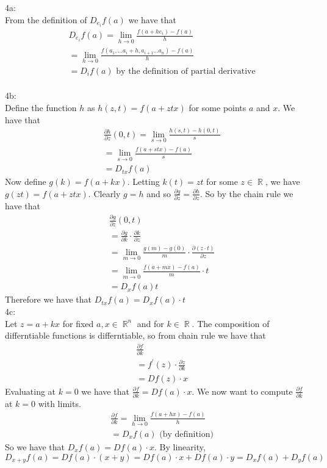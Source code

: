 \documentclass[letterpaper]{article}
\DeclareMathOperator{\R}{\mathbb{R}}
\begin{document}
 
4a:\\ From the definition of $D_{e_i}f(a)$ we have that 
\begin{align*}
   & D_{e_{i}}f(a) = \lim_{h \rightarrow 0 } \frac{f(a+he_i)-f(a)}{h}
   \\ & = \lim_{h \rightarrow 0} \frac{f(a_1, \dots a_i + h , a_{i+1} \dots a_n ) - f(a)}{h}
   \\ & = D_i f(a) \text{ by the definition of partial derivative}
\end{align*}
\\ 4b: \\ Define the function $h$  as $h(z,t) = f(a+ztx)$ for some points $a$ and $x$. We have that 
\begin{align*}
    & \frac{\partial h}{\partial z}(0,t) = \lim_{s \rightarrow 0} \frac{h(s,t)-h(0,t)}{s}
    \\ & = \lim_{s \rightarrow 0 } \frac{f(a+stx)-f(a)}{s}
    \\ & = D_{tx}f(a)
\end{align*}
Now define $g(k) = f(a+kx)$. Letting $k(t) = zt$ for some $z\in \R$, we have $g(zt) = f(a+ztx)$. Clearly $g=h$ and so $\frac{\partial g}{\partial z} = \frac{\partial h}{\partial z}$. So by the chain rule we have that 
\begin{align*}
    & \frac{\partial g}{\partial z} (0,t)
    \\ &  = \frac{\partial g}{\partial k} \cdot \frac{\partial k}{\partial z}
    \\ &  = \lim_{m \rightarrow 0 } \frac{g(m)-g(0)}{m} \cdot \frac{\partial (z\cdot t)}{\partial z}
    \\ & = \lim_{m\rightarrow 0 } \frac{f(a+mx)-f(a)}{m} \cdot t
    \\ & = D_xf(a) t
\end{align*}Therefore we have that $D_{tx}f(a) = D_xf(a)\cdot t$
\\ 4c: \\ Let $z= a+kx$ for fixed $a,x\in \R^n$ and for $k\in \R$. The composition of differntiable functions is differntiable, so from chain rule we have that 
\begin{align*}
    & \frac{\partial f}{ \partial k} 
    \\ & = f ^\prime (z) \cdot \frac{\partial z}{\partial k}
    \\ & = Df(z)\cdot x
\end{align*} Evaluating at $k=0$ we have that $\frac{\partial f}{\partial k} = Df(a)\cdot x$. We now want to compute $\frac{\partial f}{ \partial k}$  at $k=0$ with limits. 
\begin{align*}
   & \frac{\partial f }{\partial k} = \lim_{h \rightarrow 0 } \frac{f(a+hx) - f(a)}{h}
   \\ & = D_x f(a) \text{ (by definition)}
\end{align*}So we have that $D_x f(a) = Df(a) \cdot x$. By linearity, $$D_{x+y}f(a) = D f(a)\cdot (x+y) = D f(a)\cdot x + D f(a)\cdot y = D_x f(a) + D_y f(a)$$
\end{document}
